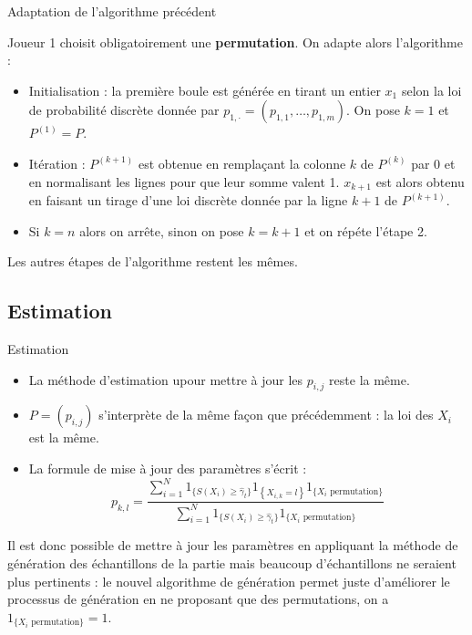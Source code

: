 \documentclass[10pt,xcolor=table,color={dvipsnames,usenames},ignorenonframetext,usepdftitle=false,french]{beamer}
\begin{document}
\begin{frame}{Adaptation de l'algorithme précédent}
\protect\hypertarget{adaptation-de-lalgorithme-pruxe9cuxe9dent-1}{}

Joueur 1 choisit obligatoirement une \textbf{permutation}. On adapte
alors l'algorithme :

\begin{itemize}
\item Initialisation : la première boule est générée en tirant un entier $x_1$ selon la loi de probabilité discrète donnée par $p_{1,\cdot} = (p_{1,1},\dots, p_{1,m})$. On pose $k=1$ et $P^{(1)} = P$.
\item Itération : $P^{(k+1)}$ est obtenue en remplaçant la colonne $k$ de $P^{(k)}$ par 0 et en normalisant les lignes pour que leur somme valent 1. $x_{k+1}$ est alors obtenu en faisant un tirage d'une loi discrète donnée par la ligne $k+1$ de $P^{(k+1)}$. 
\item Si $k=n$ alors on arrête, sinon on pose $k=k+1$ et on répéte l'étape 2.
\end{itemize}

Les autres étapes de l'algorithme restent les mêmes.

\end{frame}

\hypertarget{estimation}{%
\subsection{Estimation}\label{estimation}}

\begin{frame}{Estimation}
\protect\hypertarget{estimation-1}{}

\begin{itemize}
\item La méthode d'estimation upour mettre à jour les $p_{i,j}$ reste la même.
\item $P=(p_{i,j})$ s'interprète de la même façon que précédemment : la loi des $X_i$ est la même.
\item La formule de mise à jour des paramètres s'écrit :
$$p_{k,l}=\frac{
\sum_{i=1}^{N}1_{\{S(X_{i})\geq\hat{\gamma}_{t}\}}1_{\left\{ X_{i,k}=l\right\} }
1_{\{X_{i}\text{ permutation}\}}
}{
\sum_{i=1}^{N}1_{\{S(X_{i})\geq\hat{\gamma}_{t}\}}
1_{\{X_{i}\text{ permutation}\}}
}$$
\end{itemize}

Il est donc possible de mettre à jour les paramètres en appliquant la
méthode de génération des échantillons de la partie mais beaucoup
d'échantillons ne seraient plus pertinents : le nouvel algorithme de
génération permet juste d'améliorer le processus de génération en ne
proposant que des permutations, on a
\(1_{\{X_{i}\text{ permutation}\}} = 1\).

\end{frame}
\end{document}

